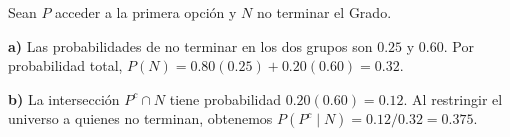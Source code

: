 Sean $P$ acceder a la primera opción y $N$ no terminar el Grado.

\textbf{a)} Las probabilidades de no terminar en los dos grupos
son $0.25$ y $0.60$. Por probabilidad total,
$P(N)=0.80(0.25)+0.20(0.60)=\boxed{0.32}$.

\textbf{b)} La intersección $P^c\cap N$ tiene probabilidad
$0.20(0.60)=0.12$. Al restringir el universo a quienes no
terminan, obtenemos $P(P^c\mid N)=0.12/0.32=\boxed{0.375}$.
